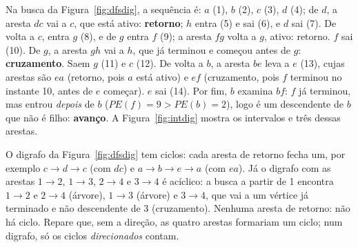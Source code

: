 \begin{exemplo}\label{ex:tipos}
Na busca da Figura~\ref{fig:dfsdig}, a sequência é: $a$ (1), $b$ (2), $c$ (3), $d$ (4); de $d$, a aresta $dc$ vai a $c$, que está ativo: \textbf{retorno}; $h$ entra (5) e sai (6), e $d$ sai (7). De volta a $c$, entra $g$ (8), e de $g$ entra $f$ (9); a aresta $fg$ volta a $g$, ativo: retorno. $f$ sai (10). De $g$, a aresta $gh$ vai a $h$, que já terminou e começou antes de $g$: \textbf{cruzamento}. Saem $g$ (11) e $c$ (12). De volta a $b$, a aresta $be$ leva a $e$ (13), cujas arestas são $ea$ (retorno, pois $a$ está ativo) e $ef$ (cruzamento, pois $f$ terminou no instante 10, antes de $e$ começar). $e$ sai (14). Por fim, $b$ examina $bf$: $f$ já terminou, mas entrou \emph{depois} de $b$ ($PE(f)=9>PE(b)=2$), logo é um descendente de $b$ que não é filho: \textbf{avanço}. A Figura~\ref{fig:intdig} mostra os intervalos e três dessas arestas.
\begin{figura}
\end{figura}
\end{exemplo}

\begin{exemplo}\label{ex:digciclo}
O digrafo da Figura~\ref{fig:dfsdig} tem ciclos: cada aresta de retorno fecha um, por exemplo $c\to d\to c$ (com $dc$) e $a\to b\to e\to a$ (com $ea$). Já o digrafo com as arestas $1\to2$, $1\to3$, $2\to4$ e $3\to4$ é acíclico: a busca a partir de 1 encontra $1\to2$ e $2\to4$ (árvore), $1\to3$ (árvore) e $3\to4$, que vai a um vértice já terminado e não descendente de 3 (cruzamento). Nenhuma aresta de retorno: não há ciclo. Repare que, sem a direção, as quatro arestas formariam um ciclo; num digrafo, só os ciclos \emph{direcionados} contam.
\end{exemplo}

